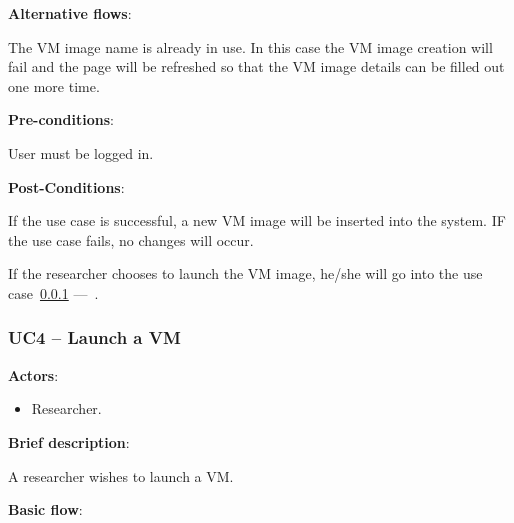\textbf{Alternative flows}:

The VM image name is already in use. In this case the VM image creation will fail and the page will be refreshed so that the VM image details can be filled out one more time.

\textbf{Pre-conditions}:

User must be logged in.

\textbf{Post-Conditions}:

If the use case is successful, a new VM image will be inserted into the system. IF the use case fails, no changes will occur.

If the researcher chooses to launch the VM image, he/she will go into the use case~\ref{uc4} ---~.

\subsubsection{UC4 -- Launch a VM}\label{uc4}

\textbf{Actors}:

\begin{itemize}
\item Researcher.
\end{itemize}

\textbf{Brief description}:

A researcher wishes to launch a VM.

\textbf{Basic flow}:

